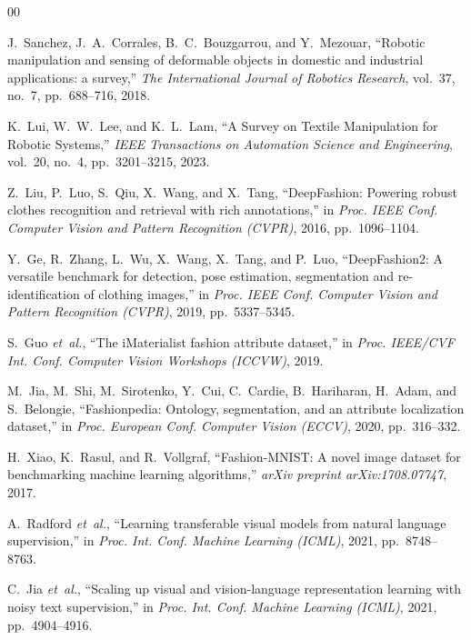 \documentclass[conference]{IEEEtran}
\begin{document}
\begin{thebibliography}{00}

J.~Sanchez, J.~A.~Corrales, B.~C.~Bouzgarrou, and Y.~Mezouar, ``Robotic manipulation and sensing of deformable objects in domestic and industrial applications: a survey,'' \emph{The International Journal of Robotics Research}, vol.~37, no.~7, pp.~688--716, 2018.

K.~Lui, W.~W.~Lee, and K.~L.~Lam, ``A Survey on Textile Manipulation for Robotic Systems,'' \emph{IEEE Transactions on Automation Science and Engineering}, vol.~20, no.~4, pp.~3201--3215, 2023.

Z.~Liu, P.~Luo, S.~Qiu, X.~Wang, and X.~Tang, ``DeepFashion: Powering
robust clothes recognition and retrieval with rich annotations,'' in
\emph{Proc. IEEE Conf. Computer Vision and Pattern Recognition (CVPR)},
2016, pp.\ 1096--1104.

Y.~Ge, R.~Zhang, L.~Wu, X.~Wang, X.~Tang, and P.~Luo, ``DeepFashion2: A
versatile benchmark for detection, pose estimation, segmentation and
re-identification of clothing images,'' in \emph{Proc. IEEE Conf. Computer
Vision and Pattern Recognition (CVPR)}, 2019, pp.\ 5337--5345.

S.~Guo \emph{et~al.}, ``The iMaterialist fashion attribute dataset,'' in
\emph{Proc. IEEE/CVF Int. Conf. Computer Vision Workshops (ICCVW)}, 2019.

M.~Jia, M.~Shi, M.~Sirotenko, Y.~Cui, C.~Cardie, B.~Hariharan, H.~Adam, and
S.~Belongie, ``Fashionpedia: Ontology, segmentation, and an attribute
localization dataset,'' in \emph{Proc. European Conf. Computer Vision
(ECCV)}, 2020, pp.\ 316--332.

H.~Xiao, K.~Rasul, and R.~Vollgraf, ``Fashion-MNIST: A novel image dataset
for benchmarking machine learning algorithms,'' \emph{arXiv preprint
arXiv:1708.07747}, 2017.

A.~Radford \emph{et~al.}, ``Learning transferable visual models from
natural language supervision,'' in \emph{Proc. Int. Conf. Machine Learning
(ICML)}, 2021, pp.\ 8748--8763.

C.~Jia \emph{et~al.}, ``Scaling up visual and vision-language
representation learning with noisy text supervision,'' in \emph{Proc. Int.
Conf. Machine Learning (ICML)}, 2021, pp.\ 4904--4916.


\end{thebibliography}
\end{document}
